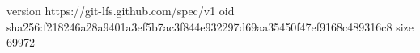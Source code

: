 version https://git-lfs.github.com/spec/v1
oid sha256:f218246a28a9401a3ef5b7ac3f844e932297d69aa35450f47ef9168c489316c8
size 69972
